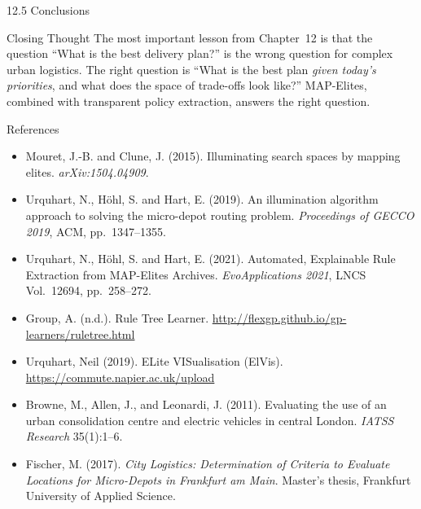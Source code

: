 \documentclass[aspectratio=169,10pt]{beamer}
\begin{document}
\begin{frame}[allowframebreaks]{12.5 Conclusions}
\medskip

\begin{alertblock}{Closing Thought}
  The most important lesson from Chapter~12 is that
  the question ``What is the best delivery plan?'' is
  the wrong question for complex urban logistics.
  The right question is ``What is the best plan \emph{given
  today's priorities}, and what does the space of trade-offs
  look like?''
  MAP-Elites, combined with transparent policy extraction,
  answers the right question.
\end{alertblock}

\end{frame}

\begin{frame}[allowframebreaks]{References}
  \begin{itemize}
    \item Mouret, J.-B. and Clune, J. (2015). Illuminating search spaces
          by mapping elites. \textit{arXiv:1504.04909}.
    \item Urquhart, N., H\"{o}hl, S. and Hart, E. (2019).
          An illumination algorithm approach to solving the micro-depot
          routing problem. \textit{Proceedings of GECCO 2019}, ACM,
          pp.~1347--1355.
    \item Urquhart, N., H\"{o}hl, S. and Hart, E. (2021).
          Automated, Explainable Rule Extraction from MAP-Elites Archives.
          \textit{EvoApplications 2021}, LNCS Vol.~12694, pp.~258--272.
    \item Group, A. (n.d.). Rule Tree Learner.
          \url{http://flexgp.github.io/gp-learners/ruletree.html}
    \item Urquhart, Neil (2019). ELite VISualisation (ElVis).
          \url{https://commute.napier.ac.uk/upload}
    \item Browne, M., Allen, J., and Leonardi, J. (2011).
          Evaluating the use of an urban consolidation centre and
          electric vehicles in central London.
          \textit{IATSS Research} 35(1):1--6.
    \item Fischer, M. (2017). \textit{City Logistics: Determination
          of Criteria to Evaluate Locations for Micro-Depots in
          Frankfurt am Main}. Master's thesis, Frankfurt University
          of Applied Science.
  \end{itemize}
\end{frame}
\end{document}
